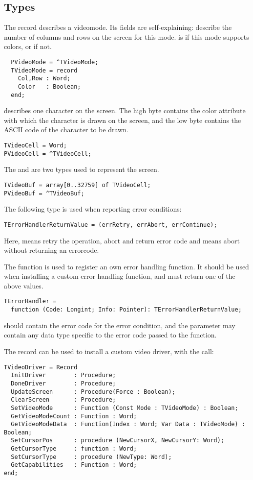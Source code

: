 \subsection{Types}
The  record describes a videomode. Its fields are
self-explaining:  describe the number of columns and 
rows on the screen for this mode.  is  if this mode
supports colors, or  if not.
\begin{verbatim}
  PVideoMode = ^TVideoMode;
  TVideoMode = record
    Col,Row : Word;
    Color   : Boolean;
  end;
\end{verbatim}
 describes one character on the screen. The high byte
contains the color attribute with which the character is drawn on the screen,
and the low byte contains the ASCII code of the character to be drawn.
\begin{verbatim}
TVideoCell = Word;
PVideoCell = ^TVideoCell;
\end{verbatim}
The  and  are two types used to represent the
screen.
\begin{verbatim}
TVideoBuf = array[0..32759] of TVideoCell;
PVideoBuf = ^TVideoBuf;
\end{verbatim}
The following type is used when reporting error conditions:
\begin{verbatim}
TErrorHandlerReturnValue = (errRetry, errAbort, errContinue);
\end{verbatim}
Here,  means retry the operation, 
abort and return error code and  means abort
without returning an errorcode.

The  function is used to register an own error
handling function. It should be used when installing a custom error
handling function, and must return one of the above values.
\begin{verbatim}
TErrorHandler = 
  function (Code: Longint; Info: Pointer): TErrorHandlerReturnValue;
\end{verbatim}
 should contain the error code for the error condition, 
and the  parameter may contain any data type specific to 
the error code passed to the function.

The  record can be used to install a custom video
driver, with the  call:
\begin{verbatim}
TVideoDriver = Record
  InitDriver        : Procedure;
  DoneDriver        : Procedure;
  UpdateScreen      : Procedure(Force : Boolean);
  ClearScreen       : Procedure;
  SetVideoMode      : Function (Const Mode : TVideoMode) : Boolean;
  GetVideoModeCount : Function : Word;
  GetVideoModeData  : Function(Index : Word; Var Data : TVideoMode) : Boolean;
  SetCursorPos      : procedure (NewCursorX, NewCursorY: Word);
  GetCursorType     : function : Word;
  SetCursorType     : procedure (NewType: Word);
  GetCapabilities   : Function : Word;
end;
\end{verbatim}

